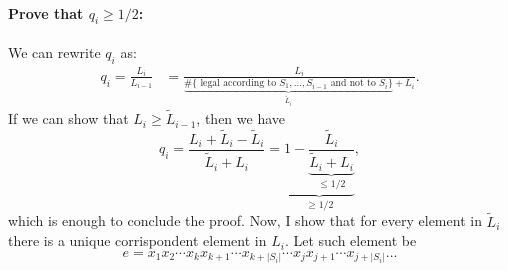 \documentclass[11pt]{article}
\begin{document}
\paragraph*{Prove that $q_i\geq1/2$:} We can rewrite $q_i$ as:
\begin{align*}
    q_i = \frac{L_i}{L_{i-1}} &= \frac{L_i}{\underbrace{\# \{\text{ legal according to } S_{1},\dots,S_{i-1}\text { and not to }S_i\}}_{\tilde{L}_{i}}+L_i}.
\end{align*}
If we can show that $L_i\geq \tilde{L}_{i-1}$, then we have
\begin{equation*}
    q_i = \frac{L_i + \tilde L_{i}- \tilde L_{i}}{\tilde L_{i}+L_i} = \underbrace{1- \underbrace{\frac{\tilde{L}_i}{\tilde L_{i}+L_i}}_{\leq 1/2}}_{\geq 1/2},
\end{equation*}
which is enough to conclude the proof. Now, I show that for every element in $\tilde L_i$ there is a unique corrispondent element in $L_i$. Let such element be 
\begin{equation*}
    e = x_1x_2\cdots x_kx_{k+1}\cdots x_{k+|S_i|}\cdots x_jx_{j+1}\cdots x_{j+|S_i|}\dots 
\end{equation*}
\end{document}
